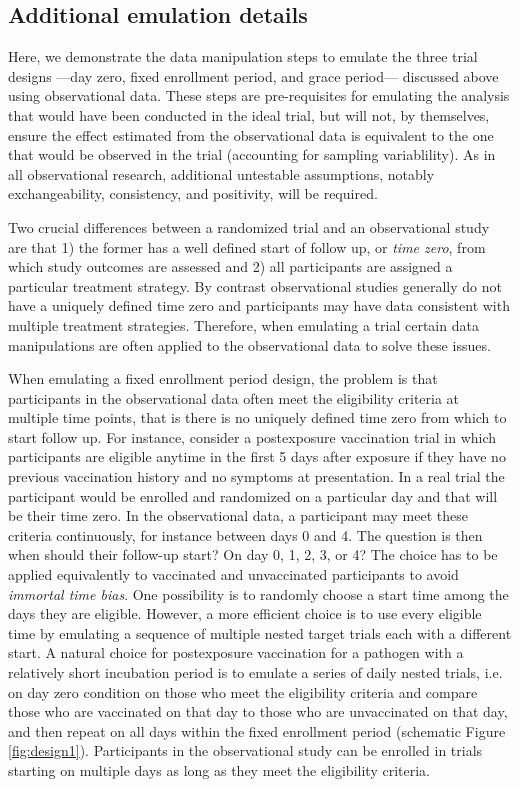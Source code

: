 \begin{appendix}
    \subsection{Additional emulation details}
    Here, we demonstrate the data manipulation steps to emulate the three trial designs ---day zero, fixed enrollment period, and grace period--- discussed above using observational data. These steps are pre-requisites for emulating the analysis that would have been conducted in the ideal trial, but will not, by themselves, ensure the effect estimated from the observational data is equivalent to the one that would be observed in the trial (accounting for sampling variablility). As in all observational research, additional untestable assumptions, notably exchangeability, consistency, and positivity, will be required. 

    Two crucial differences between a randomized trial and an observational study are that 1) the former has a well defined start of follow up, or \textit{time zero}, from which study outcomes are assessed and 2) all participants are assigned a particular treatment strategy. By contrast observational studies generally do not have a uniquely defined time zero and participants may have data consistent with multiple treatment strategies. Therefore, when emulating a trial certain data manipulations are often applied to the observational data to solve these issues. 

    When emulating a fixed enrollment period design, the problem is that participants in the observational data often meet the eligibility criteria at multiple time points, that is there is no uniquely defined time zero from which to start follow up. For instance, consider a postexposure vaccination trial in which participants are eligible anytime in the first 5 days after exposure if they have no previous vaccination history and no symptoms at presentation. In a real trial the participant would be enrolled and randomized on a particular day and that will be their time zero. In the observational data, a participant may meet these criteria continuously, for instance between days 0 and 4. The question is then when should their follow-up start? On day 0, 1, 2, 3, or 4? The choice has to be applied equivalently to vaccinated and unvaccinated participants to avoid \textit{immortal time bias}. One possibility is to randomly choose a start time among the days they are eligible. However, a more efficient choice is to use every eligible time by emulating a sequence of multiple nested target trials each with a different start. A natural choice for postexposure vaccination for a pathogen with a relatively short incubation period is to emulate a series of daily nested trials, i.e. on day zero condition on those who meet the eligibility criteria and compare those who are vaccinated on that day to those who are unvaccinated on that day, and then repeat on all days within the fixed enrollment period (schematic Figure \ref{fig:design1}). Participants in the observational study can be enrolled in trials starting on multiple days as long as they meet the eligibility criteria.
    

\end{appendix}
